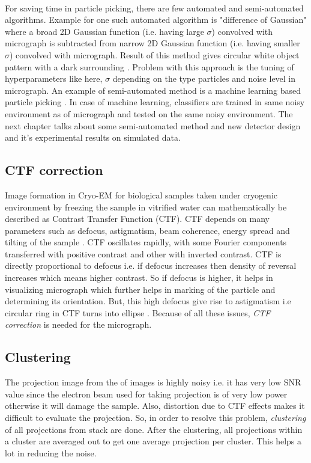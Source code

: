 \documentclass[twoside]{iitbreport}
\begin{document}
\noindent\\
For saving time in particle picking, there are few automated and semi-automated algorithms. Example for one such automated algorithm is "difference of Gaussian" where a broad 2D Gaussian function (i.e. having large $\sigma$) convolved with micrograph is subtracted from narrow 2D Gaussian function (i.e. having smaller $\sigma$) convolved with micrograph. Result of this method gives circular white object pattern  with a dark surrounding \cite{sigworth2016principles}. Problem with this approach is the tuning of hyperparameters like here, $\sigma$ depending on the type particles and noise level in micrograph. An example of semi-automated method is a machine learning based particle picking \cite{chen2012detection}. In case of machine learning, classifiers are trained in same noisy environment as of micrograph and tested on the same noisy environment. The next chapter talks about some semi-automated method and new detector design and it's experimental results on simulated data.

\subsection{CTF correction}
Image formation in Cryo-EM for biological samples taken under cryogenic environment by freezing the sample in vitrified water can mathematically be described as Contrast Transfer Function (CTF). CTF depends on many parameters such as defocus, astigmatism, beam coherence, energy spread and tilting of the sample \cite{diebolder2012pushing}. CTF oscillates rapidly, with some Fourier components transferred with positive contrast and other with inverted contrast. CTF is directly proportional to defocus i.e. if defocus increases then density of reversal increases which means higher contrast. So if defocus is higher, it helps in visualizing micrograph which further helps in marking of the particle and determining its orientation. But, this high defocus give rise to astigmatism i.e circular ring in CTF turns into  ellipse \cite{sigworth2016principles}. Because of all these issues, \textit{CTF correction} is needed for the micrograph.  

\subsection{Clustering}\label{subsec:clustering}
The projection image from the  of images is highly noisy i.e. it has very low SNR value since the electron beam used for taking projection is of very low power otherwise it will damage the sample. Also, distortion due to CTF effects makes it difficult to evaluate the projection. So, in order to resolve this problem, \textit{clustering} of all projections from stack are done. After the clustering, all projections within a cluster are averaged out to get one average projection per cluster. This helps a lot in reducing the noise.   
\end{document}
